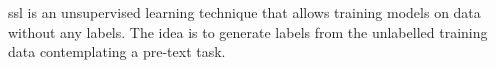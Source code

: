 \ac{ssl} is an unsupervised learning technique that allows training models on data without any labels.
The idea is to generate labels from the unlabelled training data contemplating a pre-text task.